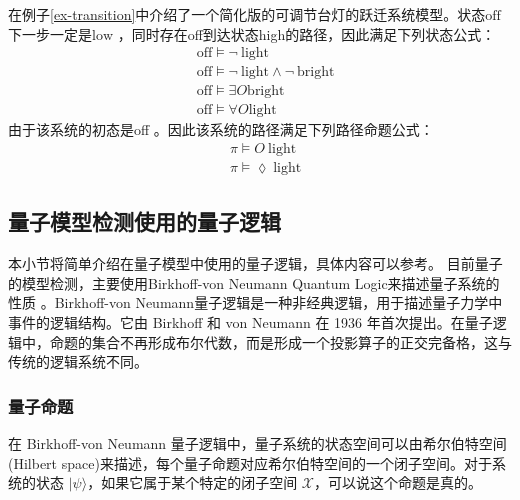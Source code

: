 \begin{example}
    在例子\ref{ex-transition}中介绍了一个简化版的可调节台灯的跃迁系统模型。状态\(\text{off}\)下一步一定是\(\text{low}\)
    ，同时存在off到达状态high的路径，因此满足下列状态公式：
    \begin{align}
        & \text{off} \models \lnot\ \text{light} \\
        & \text{off} \models \lnot\ \text{light} \land \lnot\ \text{bright}\\
        & \text{off} \models \exists O \text{bright}\\
        & \text{off} \models \forall O \text{light}
    \end{align}
    由于该系统的初态是off
    。因此该系统的路径满足下列路径命题公式：
    \begin{align}
        & \pi \models O\ \text{light} \\
        & \pi \models \lozenge\ \text{light}
    \end{align}
    
\end{example}

\subsection{量子模型检测使用的量子逻辑}
本小节将简单介绍在量子模型中使用的量子逻辑，具体内容可以参考\citep{2021}。
目前量子的模型检测，主要使用Birkhoff-von Neumann Quantum Logic来描述量子系统的性质
。Birkhoff-von Neumann量子逻辑是一种非经典逻辑，用于描述量子力学中事件的逻辑结构。它由 Birkhoff 和 von Neumann 在 1936 年首次提出。在量子逻辑中，命题的集合不再形成布尔代数，而是形成一个投影算子的正交完备格，这与传统的逻辑系统不同。


\subsubsection*{量子命题}
\label{sec-logic}
在 Birkhoff-von Neumann 量子逻辑中，量子系统的状态空间可以由希尔伯特空间(Hilbert space)来描述，每个量子命题对应希尔伯特空间的一个闭子空间。对于系统的状态 \(|\psi\rangle\)，如果它属于某个特定的闭子空间 \( \mathcal{X} \)，可以说这个命题是真的。

